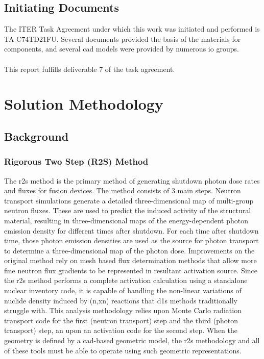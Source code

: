 \documentclass[12pt]{article}
\begin{document}
\subsection{Initiating Documents}
The ITER Task Agreement under which this work was initiated and performed is TA
C74TD21FU. Several documents provided the basis of the materials for components,
and several \gls{cad} models were provided by numerous \gls{io} groups.
\\
\\
This report fulfills deliverable 7 of the task agreement.

\newpage
\section{Solution Methodology}
\subsection{Background}
\subsubsection{Rigorous Two Step (R2S) Method}
The \gls{r2s} method \cite{r2s} is the primary method of generating shutdown
photon dose rates and fluxes for fusion devices. The method consists of 3 main
steps.  Neutron transport simulations generate a detailed three-dimensional
map of multi-group neutron fluxes.  These are used to predict the induced
activity of the structural material, resulting in three-dimensional maps of
the energy-dependent photon emission density for different times after
shutdown.  For each time after shutdown time, those photon emission densities are
used as the source for photon transport to determine a three-dimensional map
of the photon dose.  Improvements on the original method rely on mesh based
flux determination methods \cite{mcr2s,r2smesh,r2suned,pyne_r2s,Biondo201677} that allow
more fine neutron flux gradients to be represented in resultant activation
source.  Since the \gls{r2s} method performs a complete activation calculation
using a standalone nuclear inventory code, it is capable of handling the
non-linear variations of nuclide density induced by (n,xn) reactions
that \gls{d1s} methods traditionally struggle with.  This analysis methodology
relies upon Monte Carlo radiation transport code for the first 
(neutron transport) step and the third (photon transport) step, an upon an 
activation code for the second step.  When the geometry is defined by a 
\gls{cad}-based geometric model, the \gls{r2s} methodology and all of these tools
must be able to operate using such geometric representations.
\end{document}
